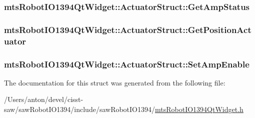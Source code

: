 \subsubsection[{Get\+Amp\+Status}]{ mts\+Robot\+I\+O1394\+Qt\+Widget\+::\+Actuator\+Struct\+::\+Get\+Amp\+Status}\label{structmts_robot_i_o1394_qt_widget_1_1_actuator_struct_a7c98ed643a2f51e4aa2adaee0b4989fc}
\hypertarget{structmts_robot_i_o1394_qt_widget_1_1_actuator_struct_a0e498ee30ff12970c23db900839d4c48}{}
\subsubsection[{Get\+Position\+Actuator}]{ mts\+Robot\+I\+O1394\+Qt\+Widget\+::\+Actuator\+Struct\+::\+Get\+Position\+Actuator}\label{structmts_robot_i_o1394_qt_widget_1_1_actuator_struct_a0e498ee30ff12970c23db900839d4c48}
\hypertarget{structmts_robot_i_o1394_qt_widget_1_1_actuator_struct_a85ac6a5f967dce213eab71e5f2c44dde}{}
\subsubsection[{Set\+Amp\+Enable}]{ mts\+Robot\+I\+O1394\+Qt\+Widget\+::\+Actuator\+Struct\+::\+Set\+Amp\+Enable}\label{structmts_robot_i_o1394_qt_widget_1_1_actuator_struct_a85ac6a5f967dce213eab71e5f2c44dde}


The documentation for this struct was generated from the following file\+:\begin{DoxyCompactItemize}
\item 
/\+Users/anton/devel/cisst-\/saw/saw\+Robot\+I\+O1394/include/saw\+Robot\+I\+O1394/\hyperlink{mts_robot_i_o1394_qt_widget_8h}{mts\+Robot\+I\+O1394\+Qt\+Widget.\+h}\end{DoxyCompactItemize}
